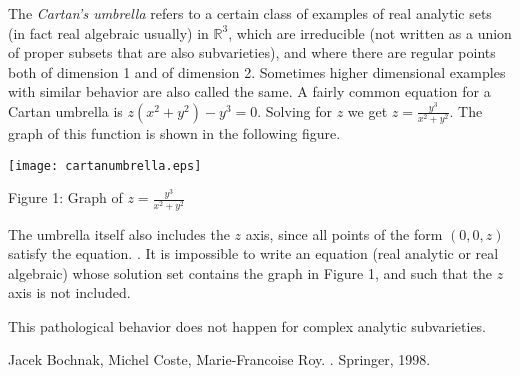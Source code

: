 \documentclass[12pt]{article}
\theoremstyle{theorem}
\theoremstyle{definition}
\theoremstyle{remark}
\begin{document}
The  {\em Cartan's umbrella} refers to a certain class of examples of real analytic sets (in fact real algebraic usually) in ${\mathbb{R}}^3$,
which are irreducible (not written as a union of proper subsets that are also subvarieties), and where
there are regular points both of dimension 1 and of dimension 2.  Sometimes higher dimensional examples with similar behavior are also called the same.  A fairly common equation for a Cartan umbrella is $z (x^2 + y^2) - y^3 = 0.$  Solving for $z$
we get $z = \frac{y^3}{x^2+y^2}$.  The graph of this function is shown in the following figure.

\begin{center}
\texttt{[image: cartanumbrella.eps]}
\vspace*{0.1in}

{\tiny Figure 1: Graph of $z = \frac{y^3}{x^2+y^2}$}
\end{center}

The umbrella itself also includes the $z$ axis, since all points of the form $(0,0,z)$ satisfy the equation.  .  It is impossible to write an equation (real analytic or real algebraic) whose solution set contains the graph in Figure 1, and such that the $z$ axis is not included.

This pathological behavior does not happen for complex analytic subvarieties.

\begin{thebibliography}{9}
Jacek Bochnak, Michel Coste, Marie-Francoise Roy.
{\em {}}.
Springer, 1998.
\end{thebibliography}

\end{document}
